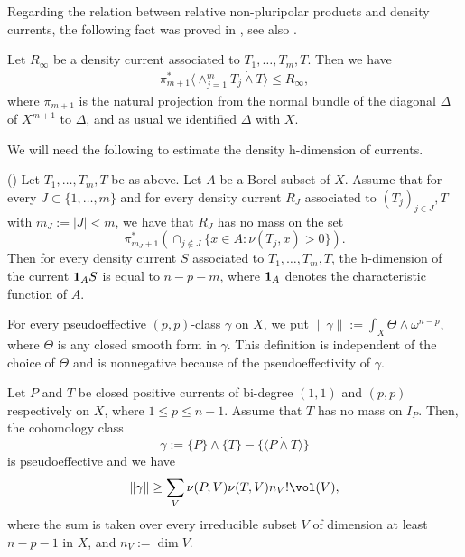    Regarding the relation between relative non-pluripolar products and density currents, the following fact was proved in \cite[Theorem 3.5]{Viet-density-nonpluripolar}, see also \cite{VietTuanLucas,Viet_Lucas}. 


    \begin{theorem} \label{the-phanbucuarestricteddenstyvanonpluri}  
        Let $R_\infty$ be a density current associated to $T_1, \ldots, T_m,T$. Then we have 
        \begin{align} \label{ine_TjS2}
            \pi_{m+1}^* \langle \wedge_{j=1}^m T_j  \dot{\wedge} T \rangle \le R_\infty,
        \end{align} 
        where $\pi_{m+1}$ is the natural projection from the normal bundle of the diagonal $\Delta$ of $X^{m+1}$ to $\Delta$, and as usual we identified $\Delta$ with $X$. 
    \end{theorem}


    We will need the following to estimate the density h-dimension of currents. 

    \begin{proposition} \label{pro-uocluongmassonsmallsetdensity} (\cite[Proposition 3.6]{Viet-density-nonpluripolar}) 
        Let $T_1,\ldots,T_m,T$ be as above. Let $A$ be a Borel subset of $X$. Assume that for every $J \subset \{1,\ldots, m\}$ and for every density current $R_J$ associated to $(T_j)_{j \in J},T$ with $m_J:=|J|<m$, we have that $R_J$ has no mass on the set $$\pi_{m_J+1}^*(\cap_{j \not \in J} \{x \in A: \nu(T_j, x) >0\}).$$
        Then for every density current $S$ associated to $T_1, \ldots, T_m,T$, the h-dimension of the current $\bold{1}_A S$ is equal to $n-p-m$, where $\bold{1}_A$ denotes the characteristic function of $A$. 
    \end{proposition}

    For every pseudoeffective $(p,p)$-class $\gamma$ on $X$, we put $\|\gamma\|:= \int_X \Theta \wedge \omega^{n-p}$, where $\Theta$ is any closed smooth form  in $\gamma$. This definition is independent of the choice of $\Theta$ and is nonnegative because of the pseudoeffectivity of $\gamma$. 

    \begin{theorem} \label{le-truonghom=1lelong} 
        Let $P$ and $T$ be closed positive currents of bi-degree $(1,1)$ and $(p,p)$ respectively on $X$, where $1 \le p \le n-1$.
        Assume that $T$ has no mass on $I_{P}$. Then, the cohomology class 
        $$\gamma:= \{P\} \wedge \{T\}- \{\langle P \dot{\wedge} T\rangle \}$$
        is pseudoeffective and we have 
        \begin{align}\label{ine-uocluonggammaVPT}
            \| \gamma\| \ge \sum_{V} \nu(P,V)\nu(T,V) 
            n_V!\vol(V),
        \end{align}
        where the sum is taken over every irreducible subset $V$ of dimension
        at least $n-p-1$ in $X$, and $n_V:= \dim V$.   
    \end{theorem}


